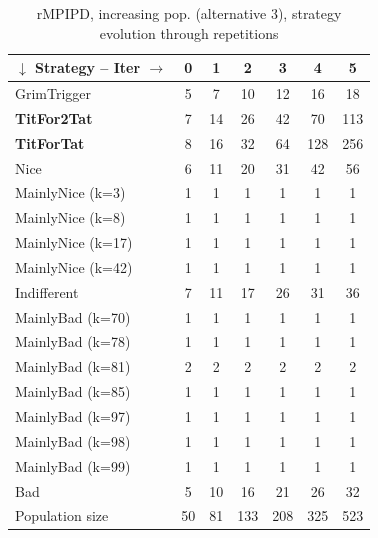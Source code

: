 \documentclass[journal,10pt,twoside]{IEEEtran}
\begin{document}
\begin{table}[ht]
    \caption{rMPIPD, increasing pop. (alternative 3), strategy evolution through repetitions}
    \label{tab:ripdmp-incrA3}
    \centering
    \begin{tabular}{l|cccccc} \toprule
        $\downarrow$ Strategy -- Iter $\rightarrow$ & 0 & 1 & 2 & 3 & 4 & 5 \\ \midrule
        GrimTrigger         &   5 &   7 &   10 &   12 &   16 &   18 \\
        \textbf{TitFor2Tat} &   7 &  14 &   26 &   42 &   70 &  113 \\
        \textbf{TitForTat}  &   8 &  16 &   32 &   64 &  128 &  256 \\
        Nice                &   6 &  11 &   20 &   31 &   42 &   56 \\
        MainlyNice (k=3)    &   1 &   1 &    1 &    1 &    1 &    1 \\
        MainlyNice (k=8)    &   1 &   1 &    1 &    1 &    1 &    1 \\
        MainlyNice (k=17)   &   1 &   1 &    1 &    1 &    1 &    1 \\
        MainlyNice (k=42)   &   1 &   1 &    1 &    1 &    1 &    1 \\
        Indifferent         &   7 &  11 &   17 &   26 &   31 &   36 \\
        MainlyBad (k=70)    &   1 &   1 &    1 &    1 &    1 &    1 \\
        MainlyBad (k=78)    &   1 &   1 &    1 &    1 &    1 &    1 \\
        MainlyBad (k=81)    &   2 &   2 &    2 &    2 &    2 &    2 \\
        MainlyBad (k=85)    &   1 &   1 &    1 &    1 &    1 &    1 \\
        MainlyBad (k=97)    &   1 &   1 &    1 &    1 &    1 &    1 \\
        MainlyBad (k=98)    &   1 &   1 &    1 &    1 &    1 &    1 \\
        MainlyBad (k=99)    &   1 &   1 &    1 &    1 &    1 &    1 \\
        Bad                 &   5 &  10 &   16 &   21 &   26 &   32 \\ \midrule
        Population size     &  50 &  81 &  133 &  208 &  325 &  523 \\ \bottomrule
    \end{tabular}
\end{table}
\end{document}
